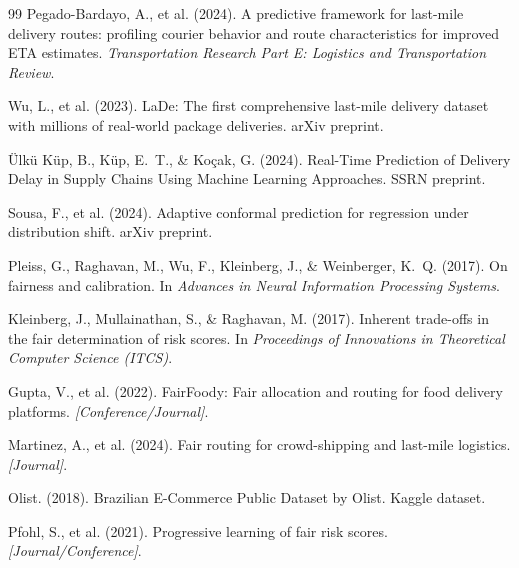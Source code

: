 \documentclass[12pt]{article}
\begin{document}
\begin{thebibliography}{99}
Pegado-Bardayo, A., et al. (2024).
A predictive framework for last-mile delivery routes: profiling courier behavior and route characteristics for improved ETA estimates.
\emph{Transportation Research Part E: Logistics and Transportation Review}.

Wu, L., et al. (2023).
LaDe: The first comprehensive last-mile delivery dataset with millions of real-world package deliveries.
arXiv preprint.

Ülkü Küp, B., Küp, E.~T., \& Koçak, G. (2024).
Real-Time Prediction of Delivery Delay in Supply Chains Using Machine Learning Approaches.
SSRN preprint.

Sousa, F., et al. (2024).
Adaptive conformal prediction for regression under distribution shift.
arXiv preprint.

Pleiss, G., Raghavan, M., Wu, F., Kleinberg, J., \& Weinberger, K.~Q. (2017).
On fairness and calibration.
In \emph{Advances in Neural Information Processing Systems}.

Kleinberg, J., Mullainathan, S., \& Raghavan, M. (2017).
Inherent trade-offs in the fair determination of risk scores.
In \emph{Proceedings of Innovations in Theoretical Computer Science (ITCS)}.

Gupta, V., et al. (2022).
FairFoody: Fair allocation and routing for food delivery platforms.
\emph{[Conference/Journal]}.

Martinez, A., et al. (2024).
Fair routing for crowd-shipping and last-mile logistics.
\emph{[Journal]}.

Olist. (2018).
Brazilian E-Commerce Public Dataset by Olist.
Kaggle dataset.

Pfohl, S., et al. (2021).
Progressive learning of fair risk scores.
\emph{[Journal/Conference]}.

\end{thebibliography}
\end{document}
